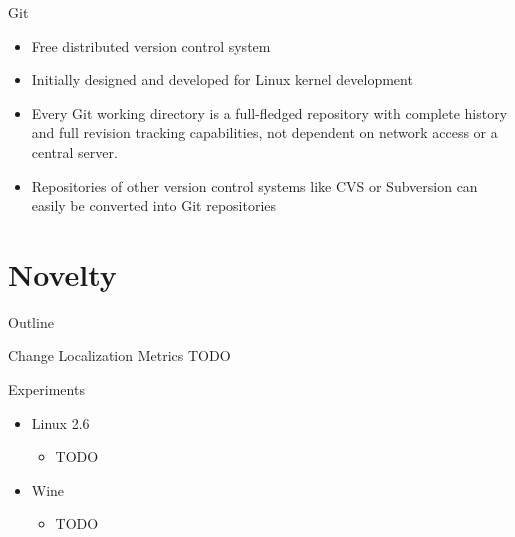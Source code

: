 
\begin{frame}{Git}
  \begin{itemize}
  \item Free distributed version control system
  \item Initially designed and developed for Linux kernel development
  \item Every Git working directory is a full-fledged repository with
    complete history and full revision tracking capabilities, not
    dependent on network access or a central server.
  \item Repositories of other version control systems like CVS or
    Subversion can easily be converted into Git repositories
  \end{itemize}
\end{frame}



\section{Novelty}

\begin{frame}{Outline}
  \tableofcontents[current]
\end{frame}


\begin{frame}{Change Localization Metrics}
  TODO
\end{frame}


\begin{frame}{Experiments}
  \begin{itemize}
  \item Linux 2.6
    \begin{itemize}
    \item TODO
    \end{itemize}
  \item Wine
    \begin{itemize}
    \item TODO
    \end{itemize}
  \end{itemize}
\end{frame}

